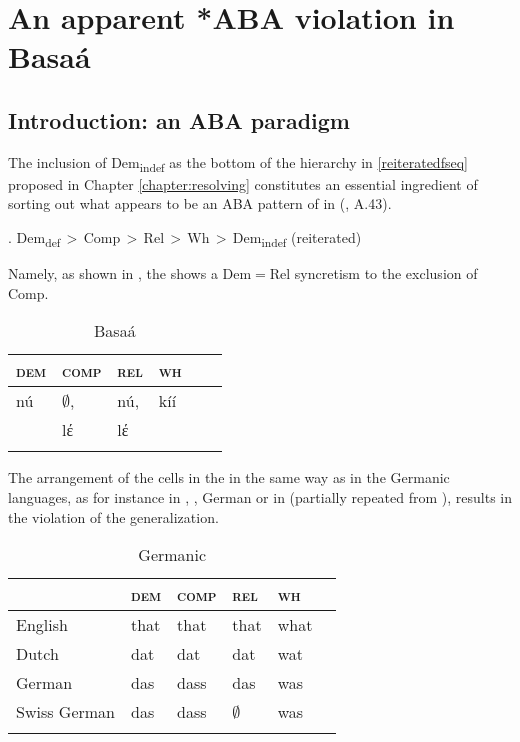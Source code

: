 \chapter{An apparent *ABA violation in Basa\'a}\label{chapter:basaa}

\section{Introduction: an ABA paradigm}

The inclusion of Dem\textsubscript{indef} as the bottom of the hierarchy in \ref{reiteratedfseq} proposed in Chapter \ref{chapter:resolving} constitutes an essential ingredient of sorting out what appears to be an ABA pattern of  in  (, A.43). 

\ex.\label{reiteratedfseq} 
Dem\textsubscript{def}\,$>$\,Comp\,$>$\,Rel\,$>$\,Wh\,$>$\,Dem\textsubscript{indef} \hfill (reiterated)

Namely, as shown in , the   shows a Dem$=$Rel syncretism to the exclusion of Comp.

\begin{table}
\caption{Basa\'a}
\label{ABA:Basaa}
\begin{tabular}[t]{ l l l l l l }
\lsptoprule
\textsc{dem} 	& \textsc{comp} 	& \textsc{rel}  	& \textsc{wh}\\	
\midrule
n\'u\cellcolor[gray]{0.9} & $\emptyset$, & n\'u,\cellcolor[gray]{0.9} & k\'i\'i\\
 & lέ\cellcolor[gray]{0.8} & lέ\cellcolor[gray]{0.8} & \\
\lspbottomrule
\end{tabular}
\end{table}

\noindent The arrangement of the cells in the    in the same way as in the Germanic languages, as for instance in , , German or  in  (partially repeated from ), results in the violation of the  generalization.

\begin{table}
\caption{Germanic}
\label{table:no-wo}
\begin{tabular}[t]{ l l l l l l }
\lsptoprule
& \textsc{dem} 	& \textsc{comp} 	& \textsc{rel}  	& \textsc{wh}\\	
\midrule
English & that\cellcolor[gray]{0.9} & that\cellcolor[gray]{0.9} & that\cellcolor[gray]{0.9} & what\\
Dutch & dat\cellcolor[gray]{0.9} & dat\cellcolor[gray]{0.9} & dat\cellcolor[gray]{0.9} 	& wat\\
German & das\cellcolor[gray]{0.9} & dass\cellcolor[gray]{0.9} & das\cellcolor[gray]{0.9} & was\\
Swiss German & das\cellcolor[gray]{0.9} & dass\cellcolor[gray]{0.9} & $\emptyset$ & was\\ 
\lspbottomrule
\end{tabular}
\end{table}

